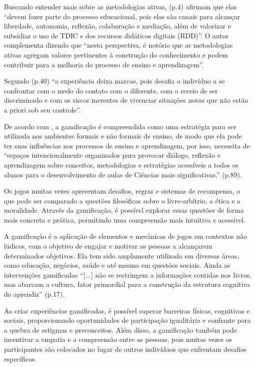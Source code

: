Buscando entender mais sobre as metodologias ativas,  (p.4) afirmam que elas ``devem fazer parte do processo educacional, pois elas são canais para alcançar liberdade, autonomia, reflexão, colaboração e mediação, além de valorizar e subsidiar o uso de TDIC e dos recursos didáticos digitais (RDD)''. O autor complementa dizendo que ``nesta perspectiva, é notório que as metodologias ativas agregam valores pertinentes à construção do conhecimento e podem contribuir para a melhoria do processo de ensino e aprendizagem''.

Segundo  (p.40) ``a experiência deixa marcas, pois desafia o indivíduo a se confrontar com o medo do contato com o diferente, com o receio de ser discriminado e com os riscos inerentes de vivenciar situações novas que não estão a priori sob seu controle''.

De acordo com , a gamificação é compreendida como uma estratégia para ser utilizada nos ambientes formais e não formais de ensino, de modo que ela pode ter suas influências nos processos de ensino e aprendizagem, por isso, necessita de ``espaços intencionalmente organizados para provocar diálogo, reflexão e aprendizagem sobre conceitos, metodologias e estratégias acessíveis a todos os alunos para o desenvolvimento de aulas de Ciências mais significativas.'' \cite{SILVA2019} (p.89).

Os jogos muitas vezes apresentam desafios, regras e sistemas de recompensa, o que pode ser comparado a questões filosóficas sobre o livre-arbítrio, a ética e a moralidade. Através da gamificação, é possível explorar essas questões de forma mais concreta e prática, permitindo uma compreensão mais intuitiva e acessível.

A gamificação é a aplicação de elementos e mecânicas de jogos em contextos não lúdicos, com o objetivo de engajar e motivar as pessoas a alcançarem determinados objetivos. Ela tem sido amplamente utilizada em diversas áreas, como educação, negócios, saúde e até mesmo em questões sociais. Ainda as intervenções gamificadas ``[...] não se restringem a informações contidas nos livros, mas abarcam a cultura, fator primordial para a construção da estrutura cognitiva do aprendiz'' \cite{SILVA-PIRES2020} (p.17).

Ao criar experiências gamificadas, é possível superar barreiras físicas, cognitivas e sociais, proporcionando oportunidades de participação igualitária e confiante para a quebra de estigmas e preconceitos. Além disso, a gamificação também pode incentivar a empatia e a compreensão entre as pessoas, pois muitas vezes os participantes são colocados no lugar de outros indivíduos que enfrentam desafios específicos.

